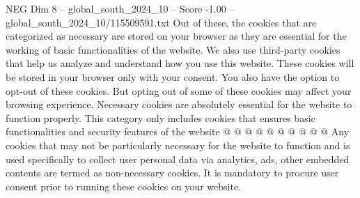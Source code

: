 \begin{textsample}{NEG Dim 8 – global\_south\_2024\_10 – Score -1.00 – global\_south\_2024\_10/115509591.txt}
Out of these, the cookies that are categorized as necessary are stored on your browser as they are essential for the working of basic functionalities of the website.
We also use third-party cookies that help us analyze and understand how you use this website.
These cookies will be stored in your browser only with your consent.
You also have the option to opt-out of these cookies.
But opting out of some of these cookies may affect your browsing experience.
Necessary cookies are absolutely essential for the website to function properly.
This category only includes cookies that ensures basic functionalities and security features of the website @ @ @ @ @ @ @ @ @ @ Any cookies that may not be particularly necessary for the website to function and is used specifically to collect user personal data via analytics, ads, other embedded contents are termed as non-necessary cookies.
It is mandatory to procure user consent prior to running these cookies on your website.

\end{textsample}
